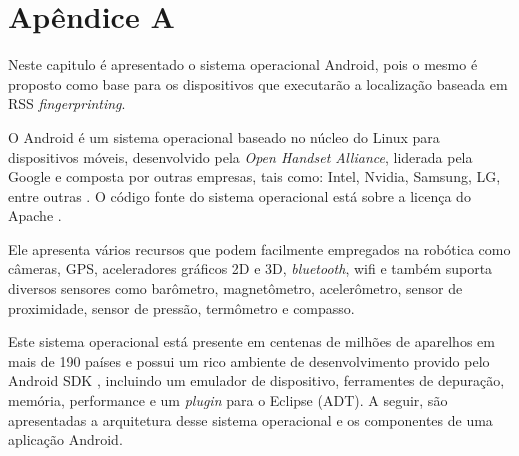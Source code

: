\chapter{Apêndice A}
\label{apendiceA}

Neste capitulo é apresentado o sistema operacional Android, pois o mesmo é proposto 
como base para os dispositivos que executarão a localização baseada em RSS \textit{fingerprinting}.

O Android é um sistema operacional baseado no núcleo do Linux para dispositivos móveis, 
desenvolvido pela \textit{Open Handset Alliance}, liderada pela Google e composta por
outras empresas, tais como: Intel, Nvidia, Samsung, LG, entre outras \cite{android0}. 
O código fonte do sistema operacional está sobre a licença do Apache \cite{apacheLicence}. 

Ele apresenta vários recursos que podem facilmente empregados na robótica como
câmeras, GPS, aceleradores gráficos 2D e 3D, \textit{bluetooth}, wifi e também
suporta diversos sensores como barômetro, magnetômetro, acelerômetro, 
 sensor de proximidade, sensor de pressão, termômetro e compasso. 
 
 Este sistema operacional está presente em centenas 
de milhões de aparelhos em mais de 190 países \cite{androidDev} e possui um rico
ambiente de desenvolvimento provido pelo Android SDK \cite{sdk}, incluindo um emulador de dispositivo, 
ferramentes de depuração, memória, performance e um \textit{plugin} para o Eclipse (ADT). 
A seguir, são apresentadas a arquitetura desse sistema operacional 
e os componentes de uma aplicação Android.

\clearpage

